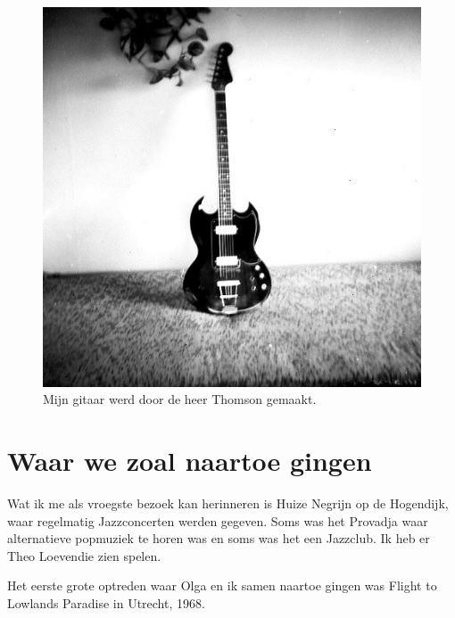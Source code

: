 \documentclass[10pt,twoside, openright]{memoir}
\begin{document}
\begin{figure}
\includegraphics[width=\textwidth]{img/ch30/Devotions}
\caption*{\footnotesize Mijn gitaar werd door de heer Thomson gemaakt.}
\end{figure} 

\chapter{Waar we zoal naartoe gingen} %
\label{cha:naartoegaan}

Wat ik me als vroegste bezoek kan herinneren is Huize Negrijn op de Hogendijk, waar regelmatig Jazzconcerten werden gegeven. Soms was het Provadja waar alternatieve popmuziek te horen was en soms was het een Jazzclub. Ik heb er Theo Loevendie zien spelen.

Het eerste grote optreden waar Olga en ik samen naartoe gingen was Flight to Lowlands Paradise in Utrecht, 1968.
\end{document}
